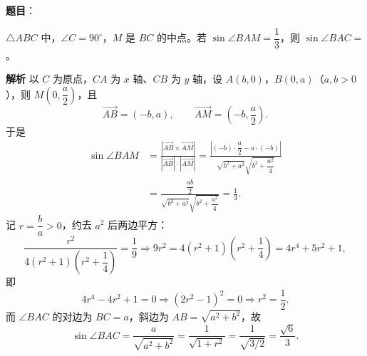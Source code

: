 \begin{answer}

\textbf{题目}：

$\triangle ABC$ 中，$\angle C=90^\circ$，$M$ 是 $BC$ 的中点。若 $\sin\angle BAM=\dfrac13$，则 $\sin\angle BAC=$\gkblank{}。

\textbf{解析}
以 $C$ 为原点，$CA$ 为 $x$ 轴、$CB$ 为 $y$ 轴，设 $A(b,0)$，$B(0,a)$（$a,b>0$），则 $M\left(0,\dfrac a2\right)$，且
\nopagebreak[4]
\[\overrightarrow{AB}=(-b,a),\qquad \overrightarrow{AM}=\left(-b,\frac a2\right).\]
于是
\nopagebreak[4]
\[\begin{aligned}
\sin\angle BAM
&=\frac{\left|\overrightarrow{AB}\times\overrightarrow{AM}\right|}{|\overrightarrow{AB}|\cdot|\overrightarrow{AM}|}
=\frac{\left|(-b)\cdot\dfrac a2-a\cdot(-b)\right|}
{\sqrt{b^2+a^2}\sqrt{b^2+\dfrac{a^2}4}}\\
&=\frac{\dfrac{ab}2}{\sqrt{b^2+a^2}\sqrt{b^2+\dfrac{a^2}4}}=\frac13.
\end{aligned}\]
记 $r=\dfrac ba>0$，约去 $a^2$ 后两边平方：
\nopagebreak[4]
\[\frac{r^2}{4(r^2+1)\left(r^2+\dfrac14\right)}=\frac19
\Longrightarrow 9r^2=4(r^2+1)\left(r^2+\frac14\right)=4r^4+5r^2+1,\]
即
\nopagebreak[4]
\[4r^4-4r^2+1=0\Longrightarrow(2r^2-1)^2=0\Longrightarrow r^2=\frac12.\]
而 $\angle BAC$ 的对边为 $BC=a$，斜边为 $AB=\sqrt{a^2+b^2}$，故
\nopagebreak[4]
\[\sin\angle BAC=\frac{a}{\sqrt{a^2+b^2}}=\frac1{\sqrt{1+r^2}}=\frac1{\sqrt{3/2}}=\frac{\sqrt6}3.\]


\end{answer}
